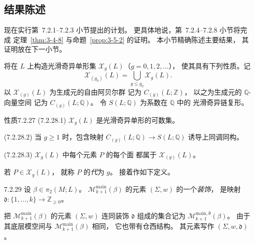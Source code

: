 
\subsection{结果陈述}
\label{subsec:7-2-4}

现在实行第~7.2.1--7.2.3 小节提出的计划。
更具体地说，第~7.2.4--7.2.8 小节将完成
定理~\ref{thm:3-4-8} 与命题~\ref{prop:3-5-2} 的证明。
本小节精确陈述主要结果，
其证明放在下一小节。

将在 $L$ 上构造光滑奇异单形集
$\mathcal X_g(L)$（$g=0,1,2,\ldots$），
使其具有下列性质。记
\begin{equation}
\mathcal X_{(g_0)}(L)
=\bigcup_{g\le g_0}\mathcal X_g(L).
\tag{7.2.26}\label{eq:7-2-26}
\end{equation}
以 $\mathcal X_{(g)}(L)$ 为生成元的自由阿贝尔群
记为 $C_{(g)}(L;\mathbb Z)$，
以之为生成元的 $\mathbb Q$-向量空间
记为 $C_{(g)}(L;\mathbb Q)$。
令 $S(L;\mathbb Q)$ 为系数在 $\mathbb Q$ 中的
光滑奇异链复形。

\begin{statement}{性质}{7.2.27}\label{prop:7-2-27}
%
\noindent\textup{(7.2.28.1)}\quad
$\mathcal X_g(L)$ 是光滑奇异单形的可数集。

\noindent\textup{(7.2.28.2)}\quad
当 $g\ge1$ 时，包含映射
$C_{(g)}(L;\mathbb Q)\to S(L;\mathbb Q)$
诱导上同调同构。

\noindent\textup{(7.2.28.3)}\quad
$\mathcal X_g(L)$ 中每个元素 $P$ 的每个面
都属于 $\mathcal X_{(g)}(L)$。
\end{statement}

若 $P\in\mathcal X_g(L)$，
就称 $P$ 的\emph{代}为 $g$。
接着作如下定义。

\begin{definition}{7.2.29}\label{def:7-2-29}
设 $\beta\in\pi_2(M;L)$。
$\mathcal M^{\mathrm{main}}_{k+1}(\beta)$
的元素 $(\Sigma,w)$ 的一个\emph{装饰}，
是映射
$\mathfrak d\colon\{1,\ldots,k\}\to\mathbb Z_{\ge0}$。
\end{definition}

把 $\mathcal M^{\mathrm{main}}_{k+1}(\beta)$
的元素 $(\Sigma,w)$ 连同装饰 $\mathfrak d$
组成的集合记为
$\mathcal M^{\mathrm{main},\mathfrak d}_{k+1}(\beta)$。
由于其底层模空间与
$\mathcal M^{\mathrm{main}}_{k+1}(\beta)$ 相同，
它也带有仓西结构。
其元素写作 $(\Sigma,w,\mathfrak d)$。

